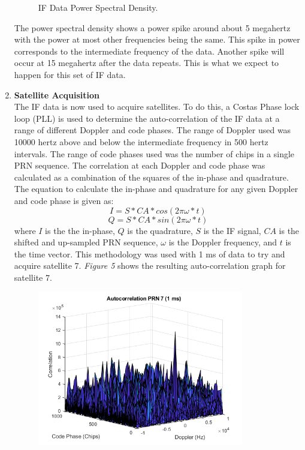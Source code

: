 \documentclass[11pt]{article}
\begin{document}
\begin{enumerate}[label=\textbf{\arabic*.}]
\begin{figure}[H]
        \caption{IF Data Power Spectral Density.}
    \end{figure}
The power spectral density shows a power spike around about 5 megahertz with the power at most other frequencies being the same. This spike in power corresponds to the intermediate frequency of the data. Another spike will occur at 15 megahertz after the data repeats. This is what we expect to happen for this set of IF data.

  \item \textbf{Satellite Acquisition} \\
The IF data is now used to acquire satellites. To do this, a Costas Phase lock loop (PLL) is used to determine the auto-correlation of the IF data at a range of different Doppler and code phases. The range of Doppler used was 10000 hertz above and below the intermediate frequency in 500 hertz intervals. The range of code phases used was the number of chips in a single PRN sequence. The correlation at each Doppler and code phase was calculated as a combination of the squares of the in-phase and quadrature. The equation to calculate the in-phase and quadrature for any given Doppler and code phase is given as:
    \begin{equation}
      I = S * CA * cos(2\pi\omega*t)
    \end{equation}
    \begin{equation}
      Q = S * CA * sin(2\pi\omega*t)
    \end{equation}
where $I$ is the the in-phase, $Q$ is the quadrature, $S$ is the IF signal, $CA$ is the shifted and up-sampled PRN sequence, $\omega$ is the Doppler frequency, and $t$ is the time vector. This methodology was used with 1 ms of data to try and acquire satellite 7. \emph{Figure 5} shows the resulting auto-correlation graph for satellite 7.
     \begin{figure}[H]
        \centering
        \includegraphics[width=0.85\textwidth]{Lab_4_PRN7_1ms.png}

\end{figure}
\end{enumerate}
\end{document}

